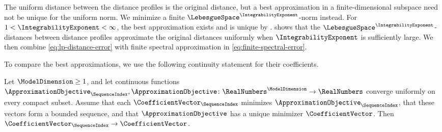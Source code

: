 The uniform distance between the distance profiles is the original distance,
but a best approximation in a finite-dimensional subspace need not be
unique for the uniform norm.
We minimize a finite
$\LebesgueSpace^\IntegrabilityExponent $-norm
instead.
For
$1<\IntegrabilityExponent <\infty$,
the best approximation exists and is unique by .
 shows that the
$\LebesgueSpace^\IntegrabilityExponent$-distances
between distance profiles
approximate the original distances uniformly when
$\IntegrabilityExponent$
is sufficiently large.
We then combine \eqref{eq:lp-distance-error} with finite spectral approximation in
\eqref{eq:finite-spectral-error}.

To compare the best approximations,
we use the following continuity statement for their coefficients.

\begin{lemma}\label{lem:minimizer-continuity}
Let
$\ModelDimension\geq1$,
and let continuous functions
$\ApproximationObjective_\SequenceIndex,\ApproximationObjective\colon
 \RealNumbers^\ModelDimension\to\RealNumbers$
converge uniformly on every compact subset.
Assume that each
$\CoefficientVector_\SequenceIndex$
minimizes
$\ApproximationObjective_\SequenceIndex$,
that these vectors form a bounded sequence,
and that
$\ApproximationObjective$
has a unique minimizer
$\CoefficientVector$.
Then
$\CoefficientVector_\SequenceIndex\to\CoefficientVector$.
\end{lemma}


